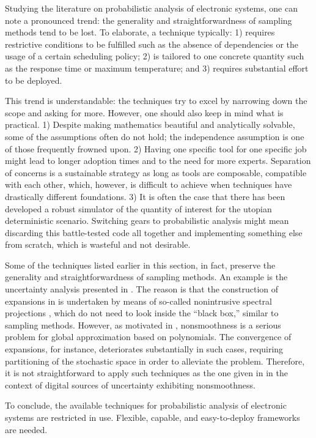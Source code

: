 Studying the literature on probabilistic analysis of electronic systems, one can
note a pronounced trend: the generality and straightforwardness of sampling
methods tend to be lost. To elaborate, a technique typically: 1) requires
restrictive conditions to be fulfilled such as the absence of dependencies or
the usage of a certain scheduling policy; 2) is tailored to one concrete
quantity such as the response time or maximum temperature; and 3) requires
substantial effort to be deployed.

This trend is understandable: the techniques try to excel by narrowing down the
scope and asking for more. However, one should also keep in mind what is
practical. 1) Despite making mathematics beautiful and analytically solvable,
some of the assumptions often do not hold; the independence assumption is one of
those frequently frowned upon. 2) Having one specific tool for one specific job
might lead to longer adoption times and to the need for more experts. Separation
of concerns is a sustainable strategy as long as tools are composable,
compatible with each other, which, however, is difficult to achieve when
techniques have drastically different foundations. 3) It is often the case that
there has been developed a robust simulator of the quantity of interest for the
utopian deterministic scenario. Switching gears to probabilistic analysis might
mean discarding this battle-tested code all together and implementing something
else from scratch, which is wasteful and not desirable.

Some of the techniques listed earlier in this section, in fact, preserve the
generality and straightforwardness of sampling methods. An example is the
uncertainty analysis presented in \cite{ukhov2015}. The reason is that the
construction of  expansions in \cite{ukhov2015} is undertaken by means of
so-called nonintrusive spectral projections \cite{xiu2010}, which do not need to
look inside the ``black box,'' similar to sampling methods. However, as
motivated in , nonsmoothness is a serious problem for global
approximation based on polynomials. The convergence of  expansions, for
instance, deteriorates substantially in such cases, requiring partitioning of
the stochastic space in order to alleviate the problem. Therefore, it is not
straightforward to apply such techniques as the one given in \cite{ukhov2015} in
the context of digital sources of uncertainty exhibiting nonsmoothness.

To conclude, the available techniques for probabilistic analysis of electronic
systems are restricted in use. Flexible, capable, and easy-to-deploy frameworks
are needed.
